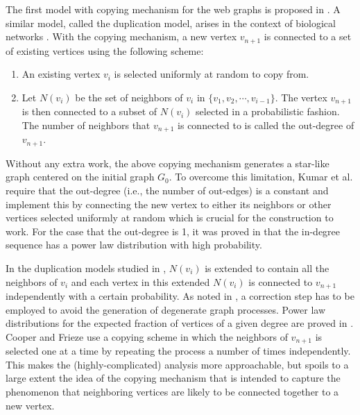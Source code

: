 \documentclass[11pt]{article}
\begin{document}
The first model with copying mechanism for the web graphs is proposed in \cite{kumar}.  A similar model, called the duplication model, arises in the context of biological networks \cite{chung03}.
With the copying mechanism,  a new vertex $v_{n + 1}$ is connected
to a set of existing vertices using the following scheme:
\begin{enumerate}
\item An existing vertex $v_i$ is selected uniformly at random to copy from.
\item Let $N(v_i)$ be the set of neighbors of $v_i$ in $\{v_1, v_2, \cdots, v_{i - 1}\}$.
The vertex $v_{n + 1}$ is then connected to a subset of $N(v_i)$ selected in a probabilistic fashion.
The number of neighbors that $v_{n+1}$ is connected to is called the out-degree of $v_{n+1}$.
\end{enumerate}
Without any extra work, the above copying mechanism generates a star-like graph centered on the initial graph $G_0$.
To overcome this limitation, Kumar et al. \cite{kumar} require that the out-degree (i.e., the number of out-edges) is a constant
and implement this by connecting the new vertex to either its neighbors or other vertices selected uniformly at random  which is crucial for the construction to work.
For the case that the out-degree is 1, it was proved in \cite{kumar} that the in-degree sequence has a power law distribution with high probability.

In the duplication models studied in \cite{chung03,bebek06}, $N(v_i)$ is extended to contain all the neighbors of $v_i$ and each vertex in this extended $N(v_i)$ is
connected to $v_{n + 1}$ independently with a certain probability. As noted in \cite{bebek06}, a correction step has to be employed to avoid the generation
of degenerate graph processes.  Power law distributions for the expected fraction of vertices of a given degree are proved
in \cite{chung03,bebek06}. 
Cooper and Frieze \cite{cooper03} use a copying scheme in which the neighbors of $v_{n+1}$ is selected one at a time
by repeating the process a number of times independently. This makes the (highly-complicated) analysis
more approachable, but spoils to a large extent the idea of
the copying mechanism that is intended to capture the phenomenon that neighboring vertices are likely to be connected together to a new vertex.
\end{document}
